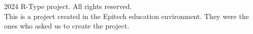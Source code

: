 \documentclass{article}
\begin{document}
\footer
    \begin{minipage}{\textwidth}
        \small \textcopyright{} 2024 R-Type project. All rights reserved. \\
        \small This is a project created in the Epitech education environment.
        \small They were the ones who asked us to create the project.
    \end{minipage}
\endfooter
\end{document}
